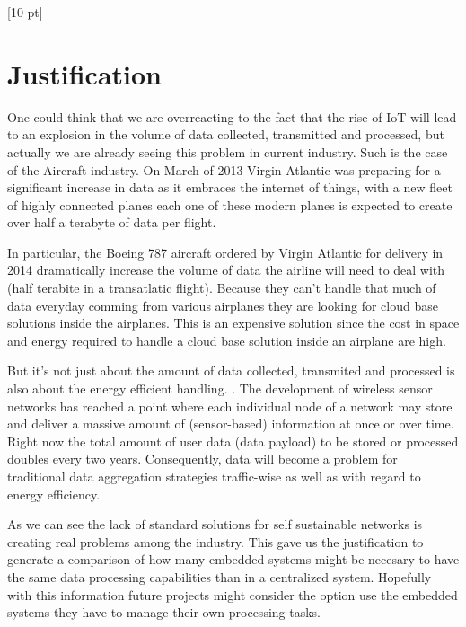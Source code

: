 \titleformat{\chapter}{\Huge\bfseries}{\thechapter}{0 pt}{\rule{340 pt}{3 pt}\\}
\titlespacing{\chapter}{100 pt}{-25 pt}{40 pt}[10 pt]	
\pagestyle{fancy}
\fancyhead[RO,RE]{\thepage}
\fancyfoot[CO,CE]{}

\chapter*{Justification}

\normalsize
\noindent

One could think that we are overreacting to the fact that the rise of IoT will
lead to an explosion in the volume of data collected, transmitted and
processed, but actually we are already seeing this problem in current industry.
Such is the case of the Aircraft industry. On March of 2013 Virgin Atlantic was
preparing for a significant increase in data as it embraces the internet of
things, with a new fleet of highly connected planes each one of these modern
planes is expected to create over half a terabyte of data per flight.

In particular, the Boeing 787 aircraft ordered by Virgin Atlantic for delivery
in 2014  dramatically increase the volume of data the airline will need to deal
with (half terabite in a transatlatic flight).  Because they can't handle that
much of data everyday comming from various airplanes they are looking
for cloud base solutions inside the airplanes. This is an expensive solution
since the cost in space and energy required to handle a cloud base solution
inside an airplane are high.

But it's not just about the amount of data collected, transmited and processed is
also about the energy efficient handling. \cite{Bergelt}. The development of
wireless sensor networks has reached a point where each individual node of a
network may store and deliver a massive amount of (sensor-based) information at
once or over time.  Right now the total amount of user data (data payload) to
be stored or processed doubles every two years. Consequently, data will become
a problem for traditional data aggregation strategies traffic-wise as well as
with regard to energy efficiency. 

As we can see the lack of standard solutions for self sustainable networks is
creating real problems among the industry. This gave us the justification to
generate a comparison of how many embedded systems might be necesary to have
the same data processing capabilities than in a centralized system. Hopefully
with this information future projects might consider the option use the
embedded systems they have to manage their own processing tasks.

\clearpage
